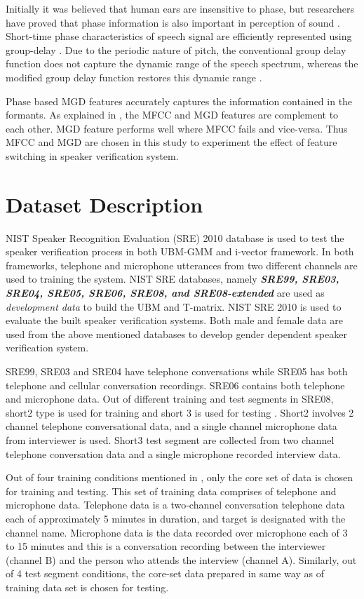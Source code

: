 \documentclass{article}
\begin{document}
Initially it was believed that human ears are insensitive to phase, but researchers have  proved that phase information is also important in perception of sound \cite{shi}.  Short-time phase characteristics of speech signal are efficiently represented using group-delay \cite{group_delay}. Due to the periodic nature of pitch, the conventional group delay function does not capture the dynamic range of the speech spectrum, whereas the modified group delay function restores this dynamic range \cite{hema_gds}.

Phase based MGD features accurately captures the information contained in the formants.  As explained in  \cite{mgd_complement}, the MFCC and MGD features are complement to each other. MGD feature performs well where MFCC fails and vice-versa. Thus MFCC and MGD are chosen in this study to experiment the effect of feature switching in speaker verification system.

\section{Dataset Description}
\label{sec:dB}
NIST Speaker Recognition Evaluation (SRE) 2010 database is used to test the speaker verification process in both UBM-GMM and i-vector framework. In both frameworks, telephone and microphone utterances from two different channels are used to training  the system. NIST SRE databases, namely {\bf {\it SRE99, SRE03, SRE04, SRE05, SRE06, SRE08, and SRE08-extended}} are used as {\it { development data}} to build the UBM and T-matrix. NIST SRE 2010 is used to evaluate the built speaker verification systems. Both male and female data are used from the above mentioned databases to develop gender dependent speaker verification system.

\vspace{0.25cm}
SRE99, SRE03 and SRE04 have telephone conversations while SRE05 has both telephone and cellular conversation recordings. SRE06 contains both telephone and microphone data. Out of different training  and test segments in SRE08, short2 type is used for training   and short 3 is used for testing  \cite{sre2008}. Short2 involves 2 channel telephone conversational data, and a single channel microphone data from interviewer is used. Short3 test segment are collected from two channel telephone conversation data and a single microphone recorded interview data. 

\vspace{0.25cm}
Out of four training  conditions mentioned in  \cite{sre2010}, only the core set of data is chosen for training   and testing. This set of training   data comprises of telephone and microphone data. Telephone data is a two-channel conversation telephone data each of approximately 5 minutes in duration, and target is designated with the channel name.  Microphone data is the data recorded over microphone each of 3 to 15 minutes and this is a conversation recording between the interviewer (channel B) and the person who attends the interview (channel A).  Similarly, out of 4 test segment conditions, the core-set data prepared in same way as of training   data set is chosen for testing.
\end{document}
